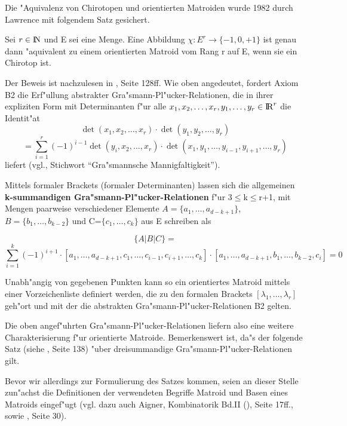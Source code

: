Die "Aquivalenz von Chirotopen und orientierten Matroiden wurde 1982 durch
Lawrence mit folgendem Satz gesichert.

\begin{satz}
Sei $r\in\mbox{$\rm I\!N$}$ und E sei eine Menge. Eine Abbildung
$\chi:E^r\to\{-1,0,+1\}$ ist genau dann "aquivalent zu einem orientierten
Matroid vom Rang r auf E, wenn sie ein Chirotop ist.
\end{satz}

Der Beweis ist nachzulesen in \cite{Bj:93}, Seite 128ff. Wie oben angedeutet,
fordert Axiom B2 die Erf"ullung abstrakter Gra"smann-Pl"ucker-Relationen,
 die in ihrer expliziten Form mit
Determinanten f"ur alle $x_1,x_2,\ldots,x_r,y_1,\ldots,y_r \in \mbox{$\rm I\!R$}^r$ die
Identit"at
$$\det(x_1,x_2,\ldots,x_r) \cdot \det(y_1,y_2,\ldots,y_r)$$
$$= \sum\limits_{i=1}^r (-1)^{i-1} \det(y_i,x_2,\ldots,x_r) \cdot
    \det(x_1,y_1,\ldots,y_{i-1},y_{i+1},\ldots,y_r)$$
liefert (vgl.\cite{Na:72}, Stichwort "`Gra"smannsche Mannigfaltigkeit"').

Mittels formaler Brackets (formaler Determinanten) lassen sich die allgemeinen
{\bf k-summandigen Gra"smann-Pl"ucker-Relationen} f"ur 3$\leq$k$\leq$r+1, mit
Mengen paarweise verschiedener Elemente $A=\{a_1,\ldots,a_{d-k+1}\}$,
$B=\{b_1,\ldots,b_{k-2}\}$ und C=$\{c_1,\ldots,c_k\}$ aus E schreiben als

{\small
$$\{A|B|C\}=$$
$$\sum\limits_{i=1}^k(-1)^{i+1}\cdot
[a_1,\ldots,a_{d-k+1},c_1,\ldots,c_{i-1},c_{i+1},\ldots,c_k]\cdot
[a_1,\ldots,a_{d-k+1},b_1,\ldots,b_{k-2},c_i]=0$$}

Unabh"angig von gegebenen Punkten kann so ein orientiertes Matroid mittels
einer Vorzeichenliste definiert werden, die zu den
formalen Brackets $[\lambda_1,\ldots,\lambda_r]$ geh"ort und mit der die
abstrakten Gra"s\-mann-Pl"ucker-Relationen B2 gelten.

Die oben angef"uhrten Gra"smann-Pl"ucker-Relationen liefern also eine weitere
Charakterisierung f"ur orientierte Matroide. Bemerkenswert ist, da"s der
folgende Satz (siehe \cite{Bj:93}, Seite 138) "uber dreisummandige
Gra"smann-Pl"ucker-Relationen
gilt.

Bevor wir allerdings zur Formulierung des Satzes kommen, seien an dieser Stelle
zun"achst die Definitionen der verwendeten Begriffe Matroid und Basen eines
Matroids eingef"ugt (vgl. dazu auch Aigner, Kombinatorik Bd.II (\cite{Aig:76}),
Seite 17ff., sowie \cite{Schu:92}, Seite 30).\label{matroid}

